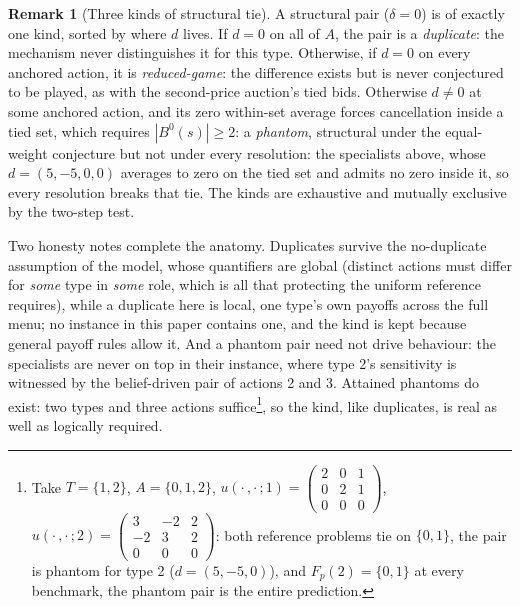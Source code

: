 \documentclass[12pt]{article}
\theoremstyle{definition}
\newtheorem{remark}{Remark}
\begin{document}
\begin{remark}[Three kinds of structural tie]\label{rem:threekinds}
A structural pair ($\delta = 0$) is of exactly one kind, sorted by where $d$ lives. If $d = 0$ on all of $A$, the pair is a \emph{duplicate}: the mechanism never distinguishes it for this type. Otherwise, if $d = 0$ on every anchored action, it is \emph{reduced-game}: the difference exists but is never conjectured to be played, as with the second-price auction's tied bids. Otherwise $d \neq 0$ at some anchored action, and its zero within-set average forces cancellation inside a tied set, which requires $|B^0(s)| \ge 2$: a \emph{phantom}, structural under the equal-weight conjecture but not under every resolution: the specialists above, whose $d = (5, -5, 0, 0)$ averages to zero on the tied set and admits no zero inside it, so every resolution breaks that tie. The kinds are exhaustive and mutually exclusive by the two-step test.
\end{remark}

Two honesty notes complete the anatomy. Duplicates survive the no-duplicate assumption of the model, whose quantifiers are global (distinct actions must differ for \emph{some} type in \emph{some} role, which is all that protecting the uniform reference requires), while a duplicate here is local, one type's own payoffs across the full menu; no instance in this paper contains one, and the kind is kept because general payoff rules allow it. And a phantom pair need not drive behaviour: the specialists are never on top in their instance, where type 2's sensitivity is witnessed by the belief-driven pair of actions 2 and 3. Attained phantoms do exist: two types and three actions suffice\footnote{Take $T = \{1, 2\}$, $A = \{0, 1, 2\}$, $u(\cdot\,,\cdot\,;1) = \left(\begin{smallmatrix} 2&0&1 \\ 0&2&1 \\ 0&0&0 \end{smallmatrix}\right)$, $u(\cdot\,,\cdot\,;2) = \left(\begin{smallmatrix} 3&-2&2 \\ -2&3&2 \\ 0&0&0 \end{smallmatrix}\right)$: both reference problems tie on $\{0,1\}$, the pair is phantom for type 2 ($d = (5,-5,0)$), and $F_p(2) = \{0, 1\}$ at every benchmark, the phantom pair is the entire prediction.}, so the kind, like duplicates, is real as well as logically required.
\end{document}

